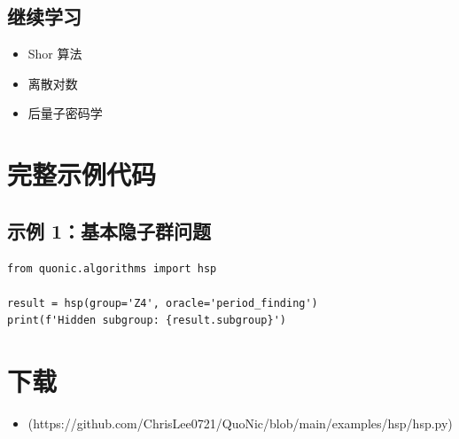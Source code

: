 \documentclass[12pt,a4paper]{article}
\begin{document}
\subsection{继续学习}
\begin{itemize}
  \item Shor 算法
  \item 离散对数
  \item 后量子密码学
\end{itemize}

\section{完整示例代码}

\subsection{示例 1：基本隐子群问题}

\begin{verbatim}
from quonic.algorithms import hsp

result = hsp(group='Z4', oracle='period_finding')
print(f'Hidden subgroup: {result.subgroup}')
\end{verbatim}

\section{下载}

\begin{itemize}
  \item [hsp.py](https://github.com/ChrisLee0721/QuoNic/blob/main/examples/hsp/hsp.py)
\end{itemize}
\end{document}
